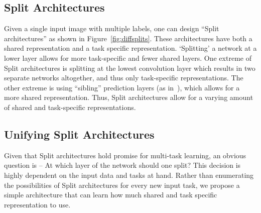 \documentclass[10pt,twocolumn,letterpaper]{article}
\begin{document}
\subsection{Split Architectures}
Given a single input image with multiple labels, one can design ``Split architectures'' as shown in Figure~\ref{fig:diffsplits}. These architectures have both a shared representation and a task specific representation. `Splitting' a network at a lower layer allows for more task-specific and fewer shared layers. One extreme of Split architectures is splitting at the lowest convolution layer which results in two separate networks altogether, and thus only task-specific representations. The other extreme is using ``sibling'' prediction layers (as in~\cite{fast-rcnn}), which allows for a more shared representation. Thus, Split architectures allow for a varying amount of shared and task-specific representations.

\subsection{Unifying Split Architectures}
Given that Split architectures hold promise for multi-task learning, an obvious question is -- At which layer of the network should one split? This decision is highly dependent on the input data and tasks at hand. Rather than enumerating the possibilities of Split architectures for every new input task, we propose a simple architecture that can learn how much shared and task specific representation to use.
\end{document}
